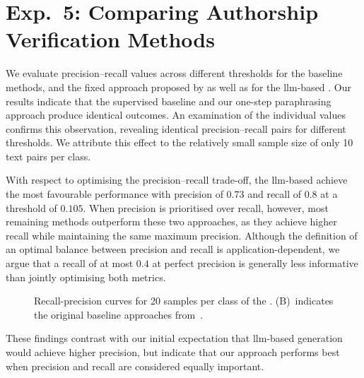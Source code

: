 \section{Exp.\ 5: Comparing Authorship Verification Methods}%
\label{subsec:imp_gen_res}

We evaluate precision–recall values across different thresholds for the baseline methods, and the fixed approach proposed by \citet{koppel_determining_2014} as well as for the \ac{llm}-based \impAppr{}.
Our results indicate that the supervised baseline and our one-step paraphrasing approach produce identical outcomes.
An examination of the individual values confirms this observation, revealing identical precision–recall pairs for different thresholds.
We attribute this effect to the relatively small sample size of only 10 text pairs per class.

With respect to optimising the precision–recall trade-off, the \ac{llm}-based \impAppr{} achieve the most favourable performance with precision of $0.73$ and recall of $0.8$ at a threshold of $0.105$.
When precision is prioritised over recall, however, most remaining methods outperform these two approaches, as they achieve higher recall while maintaining the same maximum precision.
Although the definition of an optimal balance between precision and recall is application-dependent, we argue that a recall of at most $0.4$ at perfect precision is generally less informative than jointly optimising both metrics.

\begin{figure}[htbp]
    \centering
    
    \caption[Recall-precision curves for the \dataStudent{}.]{Recall-precision curves for 20 samples per class of the \dataStudent{}. 
    (B)~indicates the original baseline approaches from~\citep{koppel_determining_2014}.
    }
    \label{fig:comp_naive_student}
\end{figure}

These findings contrast with our initial expectation that \ac{llm}-based \imp{} generation would achieve higher precision, but indicate that our approach performs best when precision and recall are considered equally important.
